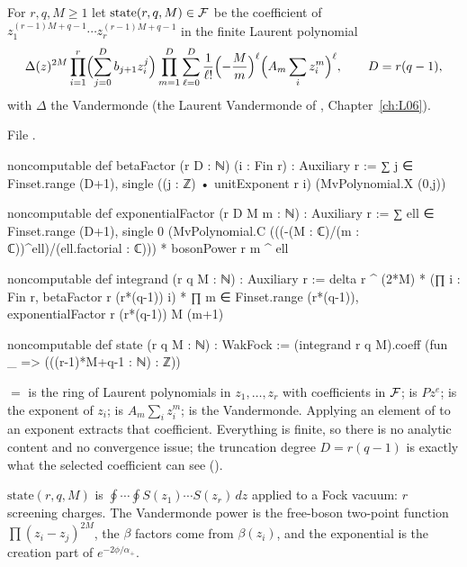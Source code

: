 \begin{definition}\label{l08:def:screen}
For $r,q,M\ge1$ let $\mathrm{state}(r,q,M)\in\mathcal{F}$ be the coefficient of
$z_1^{(r-1)M+q-1}\cdots z_r^{(r-1)M+q-1}$ in the finite Laurent polynomial
\begin{equation*}
\Delta(z)^{2M}\prod_{i=1}^r\Bigl(\sum_{j=0}^{D}b_{j+1}z_i^j\Bigr)\prod_{m=1}^{D}\sum_{\ell=0}^{D}
\frac{1}{\ell!}\Bigl(-\frac Mm\Bigr)^\ell\Bigl(A_m\sum_iz_i^m\Bigr)^\ell,\qquad D = r(q-1),
\end{equation*}
with $\Delta$ the Vandermonde (the Laurent Vandermonde of , Chapter~\ref{ch:L06}).
\end{definition}

\noindent File .
\begin{leancode}
noncomputable def betaFactor (r D : ℕ) (i : Fin r) : Auxiliary r :=
  ∑ j ∈ Finset.range (D+1),
    single ((j : ℤ) • unitExponent r i) (MvPolynomial.X (0,j))

noncomputable def exponentialFactor (r D M m : ℕ) : Auxiliary r :=
  ∑ ell ∈ Finset.range (D+1),
    single 0 (MvPolynomial.C (((-(M : ℂ)/(m : ℂ))^ell)/(ell.factorial : ℂ))) *
      bosonPower r m ^ ell

noncomputable def integrand (r q M : ℕ) : Auxiliary r :=
  delta r ^ (2*M) * (∏ i : Fin r, betaFactor r (r*(q-1)) i) *
    ∏ m ∈ Finset.range (r*(q-1)), exponentialFactor r (r*(q-1)) M (m+1)

noncomputable def state (r q M : ℕ) : WakFock :=
  (integrand r q M).coeff (fun _ => (((r-1)*M+q-1 : ℕ) : ℤ))
\end{leancode}

\begin{dictionary}
 $=$  is the ring of Laurent polynomials in
$z_1,\ldots,z_r$ with coefficients in $\mathcal{F}$;  is $Pz^e$;  is the
exponent of $z_i$;  is $A_m\sum_iz_i^m$;  is the Vandermonde. Applying an
element of  to an exponent extracts that coefficient. Everything is finite, so there is
no analytic content and no convergence issue; the truncation degree $D=r(q-1)$ is exactly what the
selected coefficient can see ().
\end{dictionary}

\begin{physics}
$\mathrm{state}(r,q,M)$ is $\oint\cdots\oint S(z_1)\cdots S(z_r)\,dz$ applied to a Fock vacuum: $r$ screening
charges. The Vandermonde power is the free-boson two-point function $\prod(z_i-z_j)^{2M}$, the $\beta$
factors come from $\beta(z_i)$, and the exponential is the creation part of $e^{-2\phi/\alpha_+}$.
\end{physics}

